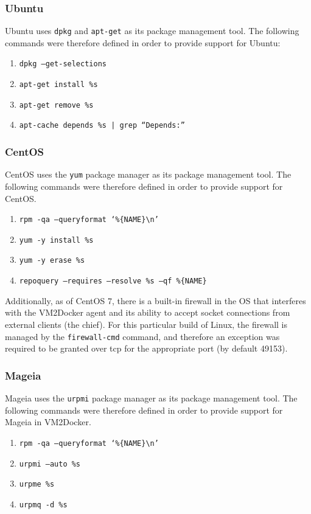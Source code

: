 \subsubsection{Ubuntu}
Ubuntu uses \texttt{dpkg} and \texttt{apt-get} as its package management tool. The following commands were therefore defined in order to provide support for Ubuntu:
\begin{enumerate}
\item \texttt{dpkg --get-selections}
\item \texttt{apt-get install \%s}
\item \texttt{apt-get remove \%s}
\item \texttt{apt-cache depends \%s | grep ``Depends:''}
\end{enumerate}
\subsubsection{CentOS}
CentOS uses the \texttt{yum} package manager as its package management tool. The following commands were therefore defined in order to provide support for CentOS.
\begin{enumerate}
\item \texttt{rpm -qa --queryformat `\%\{NAME\}\textbackslash n'}
\item \texttt{yum -y install \%s}
\item \texttt{yum -y erase \%s}
\item \texttt{repoquery --requires --resolve \%s --qf \%\{NAME\}}
\end{enumerate}

Additionally, as of CentOS 7, there is a built-in firewall in the OS that interferes with the VM2Docker agent and its ability to accept socket connections from external clients (the chief). For this particular build of Linux, the firewall is managed by the \texttt{firewall-cmd} command, and therefore an exception was required to be granted over tcp for the appropriate port (by default 49153).

\subsubsection{Mageia}
Mageia uses the \texttt{urpmi} package manager as its package management tool. The following commands were therefore defined in order to provide support for Mageia in VM2Docker.

\begin{enumerate}
\item \texttt{rpm -qa --queryformat `\%\{NAME\}\textbackslash n'}
\item \texttt{urpmi --auto \%s}
\item \texttt{urpme \%s}
\item \texttt{urpmq -d \%s}
\end{enumerate}

